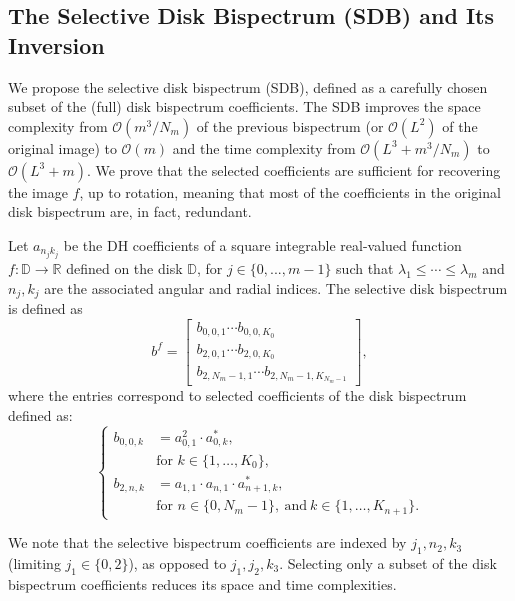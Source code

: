 \subsection{The Selective Disk Bispectrum (SDB) and Its Inversion}

We propose the selective disk bispectrum (SDB), defined as a carefully chosen subset of the (full) disk bispectrum coefficients. The SDB improves the space complexity from $\mathcal{O}(m^3/N_m)$ of the previous bispectrum (or $\mathcal{O}(L^2)$ of the original image) to $\mathcal{O}(m)$ and the time complexity from $\mathcal{O}(L^3+m^3/N_m)$ to  $\mathcal{O}(L^3 + m)$.  We prove that the selected coefficients are sufficient for recovering the image $f$, up to rotation, meaning that most of the coefficients in the original disk bispectrum are, in fact, redundant.

\begin{definition}\label{def:selective-bsp}
Let $a_{n_jk_j}$ be the DH coefficients of a square integrable real-valued function $f: \mathbb{D} \to \mathbb{R}$ defined on the disk $\mathbb{D}$, for $j \in \{0, ..., m-1\}$ such that $\lambda_1 \leq \cdots \leq \lambda_m$ and $n_j, k_j$ are the associated angular and radial indices. The selective disk bispectrum is defined as
\begin{equation}
b^f = \left[
\begin{array}{cccccccc}
b_{0,0,1}  \cdots b_{0,0,K_0} \\
b_{2,0,1}  \cdots b_{2,0,K_{0}} \\
b_{2,N_m-1,1} \cdots b_{2,N_m-1,K_{N_m -1}}
\end{array}
\right],
\end{equation}
where the entries correspond to selected coefficients of the disk bispectrum defined as:
\begin{equation}
\left\{
\begin{aligned}
    b_{0, 0, k}
    &= a_{0, 1}^2 \cdot a_{0, k}^*, \\
    & \text{for } k \in \{1, \dots, K_{0}\},\\
    b_{2, n, k}
    &= a_{1, 1} \cdot a_{n,1} \cdot a_{n+1,k}^*, \\
    & \text{for } n \in \{0, N_m-1\},~\text{and}~ k \in \{1, \dots, K_{n+1}\}.
\end{aligned}
\right.
\end{equation}
\label{eq:selective_disk_bispectrum}
\end{definition}
We note that the selective bispectrum coefficients are indexed by $j_1,n_2,k_3$ (limiting $j_1\in\{0,2\}$), as opposed to $j_1, j_2, k_3$. Selecting only a subset of the disk bispectrum coefficients reduces its space and time complexities.

